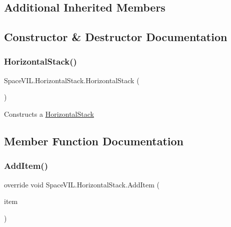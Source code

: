 \subsection*{Additional Inherited Members}


\subsection{Constructor \& Destructor Documentation}
\mbox{\label{class_space_v_i_l_1_1_horizontal_stack_a78e62c1bfb7614d2c3e7c2389d9a676d}} 
\subsubsection{\texorpdfstring{Horizontal\+Stack()}{HorizontalStack()}}
{\footnotesize\ttfamily Space\+V\+I\+L.\+Horizontal\+Stack.\+Horizontal\+Stack (\begin{DoxyParamCaption}{ }\end{DoxyParamCaption})}



Constructs a \mbox{\hyperlink{class_space_v_i_l_1_1_horizontal_stack}{Horizontal\+Stack}} 



\subsection{Member Function Documentation}
\mbox{\label{class_space_v_i_l_1_1_horizontal_stack_a159639b3438702fb5b97e78045406f0d}} 
\subsubsection{\texorpdfstring{Add\+Item()}{AddItem()}}
{\footnotesize\ttfamily override void Space\+V\+I\+L.\+Horizontal\+Stack.\+Add\+Item (\begin{DoxyParamCaption}\item[{\mbox{\hyperlink{interface_space_v_i_l_1_1_core_1_1_i_base_item}{I\+Base\+Item}}}]{item }\end{DoxyParamCaption})\hspace{0.3cm}{\ttfamily [virtual]}}



